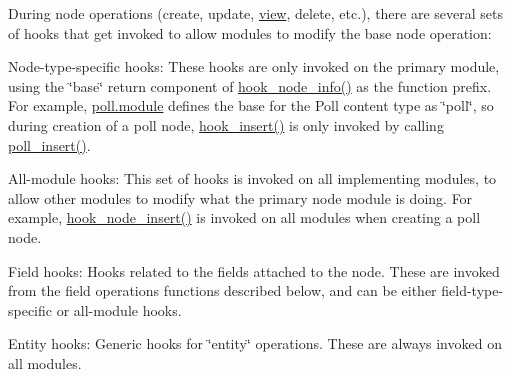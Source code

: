 During node operations (create, update, \hyperlink{classview}{view}, delete, etc.), there are several sets of hooks that get invoked to allow modules to modify the base node operation:
\begin{DoxyItemize}
\item Node-\/type-\/specific hooks: These hooks are only invoked on the primary module, using the \char`\"{}base\char`\"{} return component of \hyperlink{group__node__api__hooks_ga3b6ad51d7815d1cdd093b0e0f350cbd0}{hook\_\-node\_\-info()} as the function prefix. For example, \hyperlink{poll_8module}{poll.module} defines the base for the Poll content type as \char`\"{}poll\char`\"{}, so during creation of a poll node, \hyperlink{group__node__api__hooks_ga3c6a28d33e07d3506e1eb99718ef4e39}{hook\_\-insert()} is only invoked by calling \hyperlink{poll_8module_ad302f1defb634370507bb6e4faf99a77}{poll\_\-insert()}.
\item All-\/module hooks: This set of hooks is invoked on all implementing modules, to allow other modules to modify what the primary node module is doing. For example, \hyperlink{group__node__api__hooks_ga8b40dc62e46e5055c205d2a723dc3548}{hook\_\-node\_\-insert()} is invoked on all modules when creating a poll node.
\item Field hooks: Hooks related to the fields attached to the node. These are invoked from the field operations functions described below, and can be either field-\/type-\/specific or all-\/module hooks.
\item Entity hooks: Generic hooks for \char`\"{}entity\char`\"{} operations. These are always invoked on all modules.
\end{DoxyItemize}

